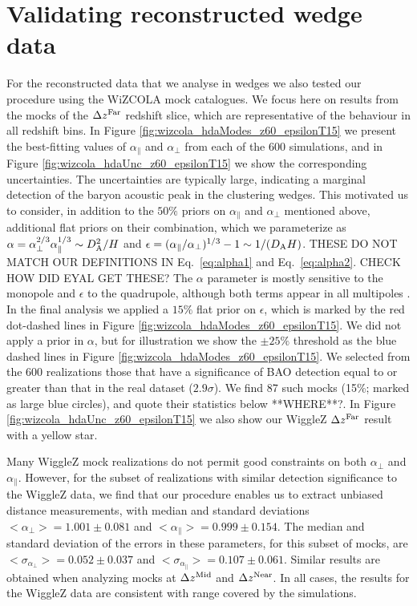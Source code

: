 \documentclass[iop,twocolappendix]{emulateapj}
\newcommand{\blue}{\color{blue}}
\newcommand{\red}{\color{red}}
\begin{document}
{\blue  %
\section{Validating reconstructed wedge data}

For the reconstructed data that we analyse in wedges we also tested our procedure using the WiZCOLA mock catalogues.  We focus
here on results from the mocks of the $\Delta z^{\rm Far}$ redshift
slice, which are representative of the behaviour in all redshift bins.
In Figure \ref{fig:wizcola_hdaModes_z60_epsilonT15} we present the
best-fitting values of $\alpha_\parallel$ and $\alpha_\perp$ from each
of the 600 simulations, and in Figure
\ref{fig:wizcola_hdaUnc_z60_epsilonT15} we show the corresponding
uncertainties.  The uncertainties are typically large, indicating a
marginal detection of the baryon acoustic peak in the clustering
wedges.  This motivated us to consider, in addition to the $50\%$
priors on $\alpha_\parallel$ and $\alpha_\perp$ mentioned above,
additional flat priors on their combination, which we parameterize as
$\alpha = \alpha_\perp^{2/3} \alpha_\parallel^{1/3} \sim D_{\rm
  A}^2/H$ and $\epsilon = (\alpha_\parallel/\alpha_\perp)^{1/3} - 1
\sim 1/(D_{\rm A} H)$.  {\red THESE DO NOT MATCH OUR DEFINITIONS IN Eq.~\ref{eq:alpha1} and Eq.~\ref{eq:alpha2}. CHECK HOW DID EYAL GET THESE?   }
The $\alpha$ parameter is mostly sensitive to
the monopole and $\epsilon$ to the quadrupole, although both terms appear in all
multipoles \citep[see][for a discussion]{PadmanabhanWhite2008}. In the
final analysis we applied a $15\%$ flat prior on $\epsilon$, which is
marked by the red dot-dashed lines in Figure
\ref{fig:wizcola_hdaModes_z60_epsilonT15}.  We did not apply a prior
in $\alpha$, but for illustration we show the $\pm 25\%$ threshold as
the blue dashed lines in Figure
\ref{fig:wizcola_hdaModes_z60_epsilonT15}.  We selected from the 600
realizations those that have a significance of BAO detection equal to
or greater than that in the real dataset ($2.9\sigma$).  We find 87
such mocks (15\%; marked as large blue circles), and quote their
statistics below {\red **WHERE**?}.  In Figure
\ref{fig:wizcola_hdaUnc_z60_epsilonT15} we also show our WiggleZ
$\Delta z^{\rm Far}$ result with a yellow star.

Many WiggleZ mock realizations do not permit good constraints on both
$\alpha_\perp$ and $\alpha_\parallel$.  However, for the subset of
realizations with similar detection significance to the WiggleZ data,
we find that our procedure enables us to extract unbiased distance
measurements, with median and standard deviations $<\alpha_\perp> =
1.001 \pm 0.081$ and $<\alpha_\parallel> = 0.999 \pm 0.154$.  The
median and standard deviation of the errors in these parameters, for
this subset of mocks, are $<\sigma_{\alpha_\perp}> = 0.052 \pm 0.037$
and $<\sigma_{\alpha_\parallel}> = 0.107 \pm 0.061$.  Similar results
are obtained when analyzing mocks at $\Delta z^{\rm Mid}$ and $\Delta
z^{\rm Near}$.  In all cases, the results for the WiggleZ data are
consistent with range covered by the simulations.

}
\end{document}
